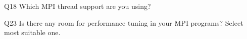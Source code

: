 \begin{description}%
\item{Q18} Which MPI thread support are you using?%
\item{Q23} Is there any room for performance tuning in your MPI programs? Select most suitable one.%
\end{description}%
